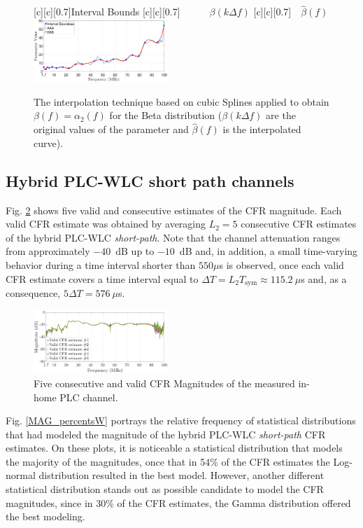 \documentclass[journal]{IEEEtran}
\begin{document}
\begin{figure}[h!]
	\centering
	[c][0.7]{Interval Bounds}
	[c][0.7]{~~~~~~$\beta(k \Delta f)$}
	[c][0.7]{~~$\hat{\beta}(f)$}
	\includegraphics[width=0.45\textwidth]{images/Beta_fit_1.7.eps}
	\caption{The interpolation technique based on cubic Splines applied to obtain $\beta(f) = \alpha_2(f)$ for the Beta distribution ($\beta(k \Delta f)$ are the original values of the parameter and $\hat{\beta}(f)$ is the interpolated curve).}
	\label{Fit_beta}
\end{figure}

\subsection{Hybrid PLC-WLC short path channels}\label{sec:MMHYBS}

 Fig. \ref{respfreqsW} shows five valid and consecutive estimates of the \ac{CFR} magnitude. Each valid \ac{CFR} estimate was obtained by averaging  $L_2=5$ consecutive \ac{CFR} estimates of the hybrid \ac{PLC}-\ac{WLC} \textit{short-path}. Note that the channel attenuation ranges from approximately $-40$~dB up to $-10$~dB and, in addition, a small time-varying behavior during a time interval shorter than $550\mu$s is observed, once each valid \ac{CFR} estimate covers a time interval equal to $\Delta T = L_2 T_{\textrm{sym}} \approx 115.2~\mu$s and, as a consequence, $5\Delta T = 576~\mu$s. 

\begin{figure}[h]
	\centering
	\includegraphics[width=0.45\textwidth]{images/respfreqsW.eps}
	\caption{Five consecutive and valid CFR Magnitudes of the measured in-home PLC channel.}
	\label{respfreqsW}
\end{figure}

Fig. \ref{MAG_percentsW} portrays the relative frequency of statistical distributions that had modeled the magnitude of the hybrid \ac{PLC}-\ac{WLC} \textit{short-path} \ac{CFR} estimates. On these plots, it is noticeable a statistical distribution that models the majority of the magnitudes, once that in 54\% of the \ac{CFR} estimates the Log-normal distribution resulted in the best model. However, another different statistical distribution stands out as possible candidate to model the \ac{CFR} magnitudes, since in 30\% of the \ac{CFR} estimates, the Gamma distribution offered the best modeling. 
\end{document}

